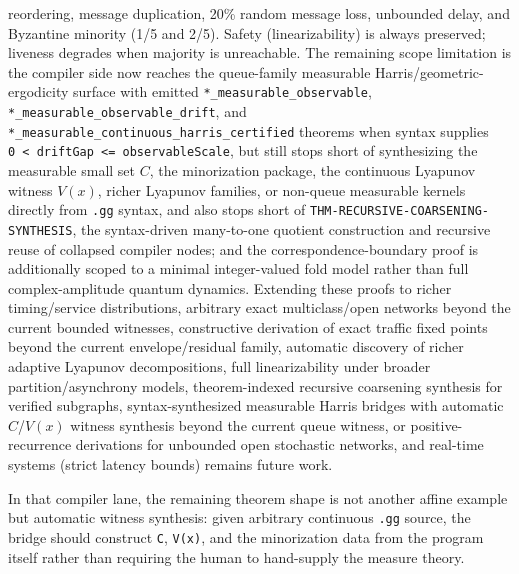 \documentclass[
  11pt,
]{article}
\begin{document}
reordering, message duplication, 20\% random message loss, unbounded
delay, and Byzantine minority (1/5 and 2/5). Safety (linearizability) is
always preserved; liveness degrades when majority is unreachable. The
remaining scope limitation is the compiler side now reaches the
queue-family measurable Harris/geometric-ergodicity surface with emitted
\texttt{*\_measurable\_observable},
\texttt{*\_measurable\_observable\_drift}, and
\texttt{*\_measurable\_continuous\_harris\_certified} theorems when
syntax supplies
\texttt{0\ \textless{}\ driftGap\ \textless{}=\ observableScale}, but
still stops short of synthesizing the measurable small set \(C\), the
minorization package, the continuous Lyapunov witness \(V(x)\), richer
Lyapunov families, or non-queue measurable kernels directly from
\texttt{.gg} syntax, and also stops short of
\texttt{THM-RECURSIVE-COARSENING-SYNTHESIS}, the syntax-driven
many-to-one quotient construction and recursive reuse of collapsed
compiler nodes; and the correspondence-boundary proof is additionally
scoped to a minimal integer-valued fold model rather than full
complex-amplitude quantum dynamics. Extending these proofs to richer
timing/service distributions, arbitrary exact multiclass/open networks
beyond the current bounded witnesses, constructive derivation of exact
traffic fixed points beyond the current envelope/residual family,
automatic discovery of richer adaptive Lyapunov decompositions, full
linearizability under broader partition/asynchrony models,
theorem-indexed recursive coarsening synthesis for verified subgraphs,
syntax-synthesized measurable Harris bridges with automatic
\(C\)/\(V(x)\) witness synthesis beyond the current queue witness, or
positive-recurrence derivations for unbounded open stochastic networks,
and real-time systems (strict latency bounds) remains future work.

In that compiler lane, the remaining theorem shape is not another affine
example but automatic witness synthesis: given arbitrary continuous
\texttt{.gg} source, the bridge should construct \texttt{C},
\texttt{V(x)}, and the minorization data from the program itself rather
than requiring the human to hand-supply the measure theory.
\end{document}

